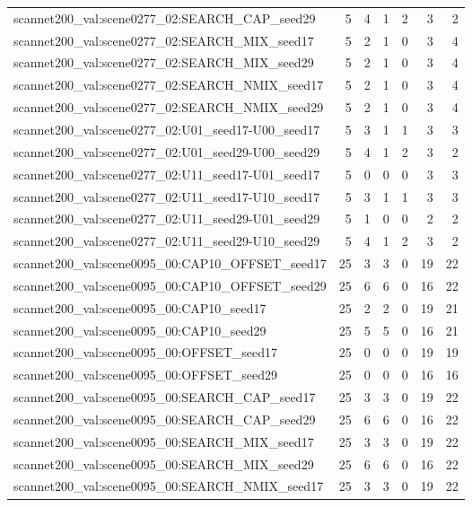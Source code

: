 \begin{table}[t]
\begin{tabular}{lrrrrrr}
scannet200\_val:scene0277\_02:SEARCH\_CAP\_seed29 & 5 & 4 & 1 & 2 & 3 & 2 \\
scannet200\_val:scene0277\_02:SEARCH\_MIX\_seed17 & 5 & 2 & 1 & 0 & 3 & 4 \\
scannet200\_val:scene0277\_02:SEARCH\_MIX\_seed29 & 5 & 2 & 1 & 0 & 3 & 4 \\
scannet200\_val:scene0277\_02:SEARCH\_NMIX\_seed17 & 5 & 2 & 1 & 0 & 3 & 4 \\
scannet200\_val:scene0277\_02:SEARCH\_NMIX\_seed29 & 5 & 2 & 1 & 0 & 3 & 4 \\
scannet200\_val:scene0277\_02:U01\_seed17-U00\_seed17 & 5 & 3 & 1 & 1 & 3 & 3 \\
scannet200\_val:scene0277\_02:U01\_seed29-U00\_seed29 & 5 & 4 & 1 & 2 & 3 & 2 \\
scannet200\_val:scene0277\_02:U11\_seed17-U01\_seed17 & 5 & 0 & 0 & 0 & 3 & 3 \\
scannet200\_val:scene0277\_02:U11\_seed17-U10\_seed17 & 5 & 3 & 1 & 1 & 3 & 3 \\
scannet200\_val:scene0277\_02:U11\_seed29-U01\_seed29 & 5 & 1 & 0 & 0 & 2 & 2 \\
scannet200\_val:scene0277\_02:U11\_seed29-U10\_seed29 & 5 & 4 & 1 & 2 & 3 & 2 \\
scannet200\_val:scene0095\_00:CAP10\_OFFSET\_seed17 & 25 & 3 & 3 & 0 & 19 & 22 \\
scannet200\_val:scene0095\_00:CAP10\_OFFSET\_seed29 & 25 & 6 & 6 & 0 & 16 & 22 \\
scannet200\_val:scene0095\_00:CAP10\_seed17 & 25 & 2 & 2 & 0 & 19 & 21 \\
scannet200\_val:scene0095\_00:CAP10\_seed29 & 25 & 5 & 5 & 0 & 16 & 21 \\
scannet200\_val:scene0095\_00:OFFSET\_seed17 & 25 & 0 & 0 & 0 & 19 & 19 \\
scannet200\_val:scene0095\_00:OFFSET\_seed29 & 25 & 0 & 0 & 0 & 16 & 16 \\
scannet200\_val:scene0095\_00:SEARCH\_CAP\_seed17 & 25 & 3 & 3 & 0 & 19 & 22 \\
scannet200\_val:scene0095\_00:SEARCH\_CAP\_seed29 & 25 & 6 & 6 & 0 & 16 & 22 \\
scannet200\_val:scene0095\_00:SEARCH\_MIX\_seed17 & 25 & 3 & 3 & 0 & 19 & 22 \\
scannet200\_val:scene0095\_00:SEARCH\_MIX\_seed29 & 25 & 6 & 6 & 0 & 16 & 22 \\
scannet200\_val:scene0095\_00:SEARCH\_NMIX\_seed17 & 25 & 3 & 3 & 0 & 19 & 22 \\

\end{tabular}
\end{table}
